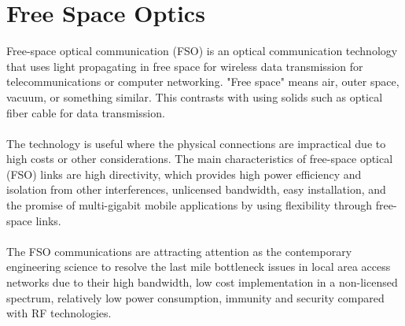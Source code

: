 \documentclass[hidelinks, 12pt]{report}
\begin{document}
\section{Free Space Optics}
\justify
Free-space optical communication (FSO) is an optical communication technology that uses light propagating in free space for wireless data transmission for telecommunications or computer networking. "Free space" means air, outer space, vacuum, or something similar. This contrasts with using solids such as optical fiber cable for data transmission.\\
\\The technology is useful where the physical connections are impractical due to high costs or other considerations. The main characteristics of free-space optical (FSO) links are high directivity, which provides
high power efficiency and isolation from other interferences, unlicensed bandwidth, easy installation,
and the promise of multi-gigabit mobile applications by using flexibility through free-space
links.\\
\\The FSO communications are attracting attention as the contemporary engineering science to resolve the last mile bottleneck issues in local area  access networks due to their high bandwidth, low cost implementation in a non-licensed spectrum, relatively low power consumption, immunity and security compared with RF technologies. 
\end{document}
